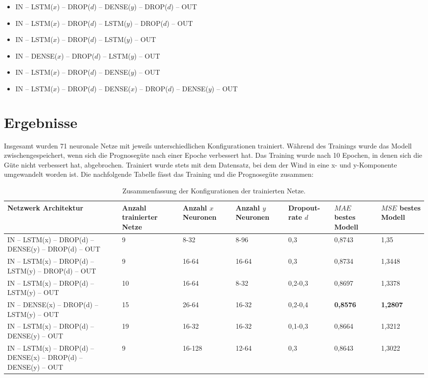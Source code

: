 \documentclass[
12pt, %
toc=listofnumbered, %
toc=chapterentrydotfill, %
numbers=noenddot, %
captions=tableheading, %
bibliography=numbered
]{scrreprt}
\let\Oldsection\section
\renewcommand{\section}{\FloatBarrier\Oldsection}
\begin{document}
\begin{itemize}
\begin{itemize}
		\begin{itemize}
			\item IN – LSTM($x$) – DROP($d$) – DENSE($y$) – DROP($d$) – OUT
			\item IN – LSTM($x$) – DROP($d$) – LSTM($y$) – DROP($d$) – OUT
			\item IN – LSTM($x$) – DROP($d$) – LSTM($y$) – OUT
			\item IN – DENSE($x$) – DROP($d$) – LSTM($y$) – OUT
			\item IN – LSTM($x$) – DROP($d$) – DENSE($y$) – OUT
			\item IN – LSTM($x$) – DROP($d$) – DENSE($x$) – DROP($d$) – DENSE($y$) – OUT

		\end{itemize}


		
	\end{itemize}
\end{itemize}


\section{Ergebnisse}\label{section:ergebnisse_training}
Insgesamt wurden 71 neuronale Netze mit jeweils unterschiedlichen Konfigurationen trainiert. Während des Trainings wurde das Modell zwischengespeichert, wenn sich die Prognosegüte nach einer Epoche verbessert hat. Das Training wurde nach 10 Epochen, in denen sich die Güte nicht verbessert hat, abgebrochen. Trainiert wurde stets mit dem Datensatz, bei dem der Wind in eine x- und y-Komponente umgewandelt worden ist. Die nachfolgende Tabelle fässt das Training und die Prognosegüte zusammen:

\begin{table}[ht]
	\centering
	\caption{Zusammenfassung der Konfigurationen der trainierten Netze.}
	\begin{tabular}{|C{2.5cm}|C{1.8cm}|C{2cm}|C{2cm}|C{2cm}|C{1.8cm}|C{1.8cm}|}
	\hline
	\textbf{Netzwerk Architektur} & \textbf{Anzahl trainierter Netze} & \textbf{Anzahl $x$ Neuronen} & \textbf{Anzahl $y$ Neuronen} & \textbf{Dropout-rate $d$} & \textbf{$MAE$ bestes Modell} & \textbf{$MSE$ bestes Modell} \\
	\hline
	IN – LSTM(x) – DROP(d) – DENSE(y) – DROP(d) – OUT & 9 & 8-32 & 8-96 & 0,3 & 0,8743 & 1,35 \\
	\hline
	IN – LSTM(x) – DROP(d) – LSTM(y) – DROP(d) – OUT & 9 & 16-64 & 16-64 & 0,3 & 0,8734 & 1,3448 \\
	\hline
	IN – LSTM(x) – DROP(d) – LSTM(y) – OUT & 10 & 16-64 & 8-32 & 0,2-0,3 & 0,8697 & 1,3378 \\
	\hline
	IN – DENSE(x) – DROP(d) – LSTM(y) – OUT & 15 & 26-64 & 16-32 & 0,2-0,4 & \textbf{0,8576} & \textbf{1,2807} \\
	\hline
	IN – LSTM(x) – DROP(d) – DENSE(y) – OUT & 19 & 16-32 & 16-32 & 0,1-0,3 & 0,8664 & 1,3212 \\
	\hline
	IN – LSTM(x) – DROP(d) – DENSE(x) – DROP(d) – DENSE(y) – OUT & 9 & 16-128 & 12-64 & 0,3 & 0,8643 & 1,3022\\
	\hline
	\end{tabular}
\end{table}
\end{document}
